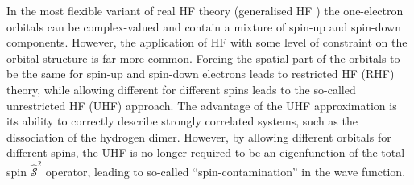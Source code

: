 \documentclass[aps,prb,reprint,noshowkeys,superscriptaddress]{revtex4-1}
\begin{document}
In the most flexible variant of real HF theory (generalised HF \cite{Mayer_1993}) the one-electron orbitals can be complex-valued
and contain a mixture of spin-up and spin-down components.\cite{Mayer_1993}
However, the application of HF with some level of constraint on the orbital structure is far more common.
Forcing the spatial part of the orbitals to be the same for spin-up and spin-down electrons leads to restricted HF (RHF) theory, while allowing different for different spins leads to the so-called unrestricted HF (UHF) approach.
The advantage of the UHF approximation is its ability to correctly describe strongly correlated systems, 
such as the dissociation of the hydrogen dimer.\cite{Coulson_1949}
However, by allowing different orbitals for different spins, the UHF is no longer required to be an eigenfunction of 
the total spin $\hat{\mathcal{S}}^2$ operator, leading to so-called ``spin-contamination'' in the wave function.

%
%
\end{document}
